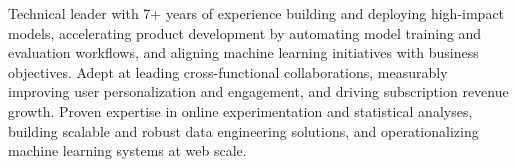 
Technical leader with 7+ years of experience building and deploying high-impact models, accelerating product development by automating model training and evaluation workflows, and aligning machine learning initiatives with business objectives. 
Adept at leading cross-functional collaborations, measurably improving user personalization and engagement, and driving subscription revenue growth. 
Proven expertise in online experimentation and statistical analyses, building scalable and robust data engineering solutions, and operationalizing machine learning systems at web scale.

